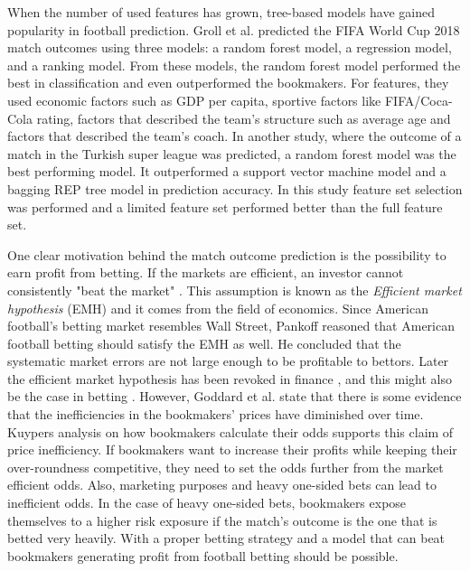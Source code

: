 When the number of used features has grown, tree-based models have gained popularity in football prediction. Groll et al.\cite{groll2018prediction} predicted the FIFA World Cup 2018 match outcomes using three models: a random forest model, a regression model, and a ranking model. From these models, the random forest model performed the best in classification and even outperformed the bookmakers. For features, they used economic factors such as GDP per capita, sportive factors like FIFA/Coca-Cola rating, factors that described the team's structure such as average age and factors that described the team's coach. In another study, where the outcome of a match in the Turkish super league was predicted, a random forest model was the best performing model. It outperformed a support vector machine model and a bagging REP tree model in prediction accuracy. In this study feature set selection was performed and a limited feature set performed better than the full feature set. \cite{10.1007/978-3-319-29504-6_48}

One clear motivation behind the match outcome prediction is the possibility to earn profit from betting. If the markets are efficient, an investor cannot consistently "beat the market" \cite{badarinathi1996football}. This assumption is known as the \textit{Efficient market hypothesis} (EMH) and it comes from the field of economics. Since American football's betting market resembles Wall Street, Pankoff \cite{pankoff1968market} reasoned that American football betting should satisfy the EMH as well. He concluded that the systematic market errors are not large enough to be profitable to bettors. Later the efficient market hypothesis has been revoked in finance \cite{jegadeesh1993returns}, and this might also be the case in betting \cite{goddard2003modelling, badarinathi1996football}. However, Goddard et al. \cite{goddard2003modelling} state that there is some evidence that the inefficiencies in the bookmakers’ prices have diminished over time. Kuypers \cite{kuypers2008} analysis on how bookmakers calculate their odds supports this claim of price inefficiency. If bookmakers want to increase their profits while keeping their over-roundness competitive, they need to set the odds further from the market efficient odds. Also, marketing purposes and heavy one-sided bets can lead to inefficient odds. In the case of heavy one-sided bets, bookmakers expose themselves to a higher risk exposure if the match's outcome is the one that is betted very heavily. With a proper betting strategy and a model that can beat bookmakers generating profit from football betting should be possible.

